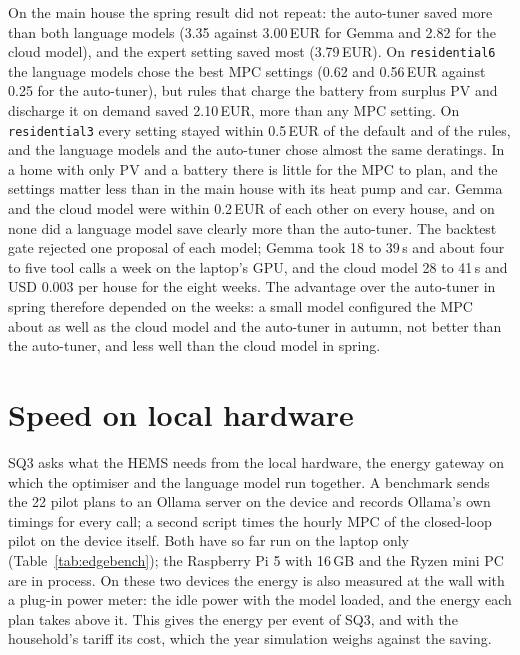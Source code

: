 \documentclass[12pt,a4paper]{report}
\begin{document}
On the main house the spring result did not repeat: the auto-tuner
saved more than both language models (3.35 against 3.00\,EUR for Gemma
and 2.82 for the cloud model), and the expert setting saved most
(3.79\,EUR). On \texttt{residential6} the language models chose the
best MPC settings (0.62 and 0.56\,EUR against 0.25 for the auto-tuner),
but rules that charge the battery from surplus PV and discharge it on
demand saved 2.10\,EUR, more than any MPC setting. On
\texttt{residential3} every setting stayed within 0.5\,EUR of the
default and of the rules, and the language models and the auto-tuner
chose almost the same deratings. In a home with only PV and a battery
there is little for the MPC to plan, and the settings matter less than
in the main house with its heat pump and car. Gemma and the cloud model
were within 0.2\,EUR of each other on every house, and on none did a
language model save clearly more than the auto-tuner. The backtest gate
rejected one proposal of each model; Gemma took 18 to 39\,s and about
four to five tool calls a week on the laptop's GPU, and the cloud model
28 to 41\,s and USD 0.003 per house for the eight weeks. The advantage
over the auto-tuner in spring therefore depended on the weeks: a small
model configured the MPC about as well as the cloud model and the
auto-tuner in autumn, not better than the auto-tuner, and less well
than the cloud model in spring.

\section{Speed on local hardware}
\label{sec:edgebench}

SQ3 asks what the HEMS needs from the local hardware, the energy
gateway on which the optimiser and the language model run together. A
benchmark sends the 22 pilot plans to an Ollama server on the device
and records Ollama's own timings for every call; a second script times
the hourly MPC of the closed-loop pilot on the device itself. Both have
so far run on the laptop only (Table~\ref{tab:edgebench}); the Raspberry
Pi 5 with 16\,GB and the Ryzen mini PC are in process. On these two
devices the energy is also measured at the wall with a plug-in power
meter: the idle power with the model loaded, and the energy each plan
takes above it. This gives the energy per event of SQ3, and with the
household's tariff its cost, which the year simulation weighs against
the saving.
\end{document}
